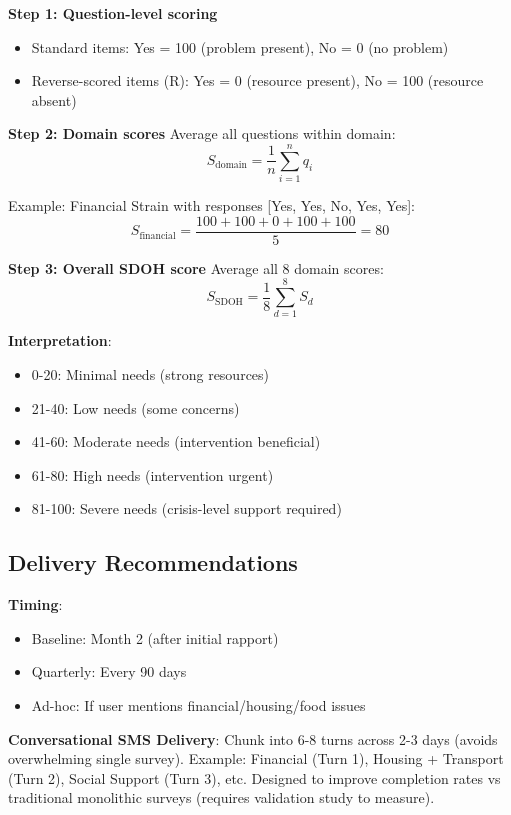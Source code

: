 \documentclass{article}
\begin{document}
\textbf{Step 1: Question-level scoring}
\begin{itemize}
    \item Standard items: Yes = 100 (problem present), No = 0 (no problem)
    \item Reverse-scored items (R): Yes = 0 (resource present), No = 100 (resource absent)
\end{itemize}

\textbf{Step 2: Domain scores}  
Average all questions within domain:
$$S_{\text{domain}} = \frac{1}{n} \sum_{i=1}^{n} q_i$$

Example: Financial Strain with responses [Yes, Yes, No, Yes, Yes]:
$$S_{\text{financial}} = \frac{100 + 100 + 0 + 100 + 100}{5} = 80$$

\textbf{Step 3: Overall SDOH score}  
Average all 8 domain scores:
$$S_{\text{SDOH}} = \frac{1}{8} \sum_{d=1}^{8} S_{d}$$

\textbf{Interpretation}:
\begin{itemize}
    \item 0-20: Minimal needs (strong resources)
    \item 21-40: Low needs (some concerns)
    \item 41-60: Moderate needs (intervention beneficial)
    \item 61-80: High needs (intervention urgent)
    \item 81-100: Severe needs (crisis-level support required)
\end{itemize}

\subsection*{Delivery Recommendations}

\textbf{Timing}:
\begin{itemize}
    \item Baseline: Month 2 (after initial rapport)
    \item Quarterly: Every 90 days
    \item Ad-hoc: If user mentions financial/housing/food issues
\end{itemize}

\textbf{Conversational SMS Delivery}: Chunk into 6-8 turns across 2-3 days (avoids overwhelming single survey). Example: Financial (Turn 1), Housing + Transport (Turn 2), Social Support (Turn 3), etc. Designed to improve completion rates vs traditional monolithic surveys (requires validation study to measure).
\end{document}
